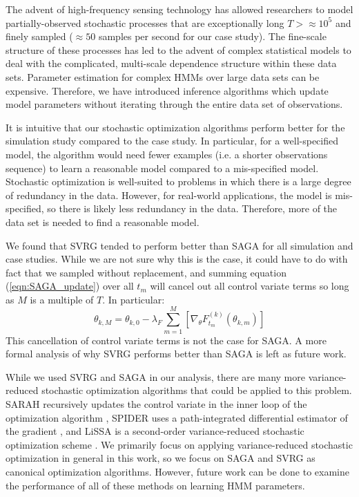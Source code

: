 
The advent of high-frequency sensing technology has allowed researchers to model partially-observed stochastic processes that are exceptionally long $T > \approx 10^5$ and finely sampled ($\approx 50$ samples per second for our case study). The fine-scale structure of these processes has led to the advent of complex statistical models to deal with the complicated, multi-scale dependence structure within these data sets. Parameter estimation for complex HMMs over large data sets can be expensive. Therefore, we have introduced inference algorithms which update model parameters without iterating through the entire data set of observations.

It is intuitive that our stochastic optimization algorithms perform better for the simulation study compared to the case study. In particular, for a well-specified model, the algorithm would need fewer examples (i.e. a shorter observations sequence) to learn a reasonable model compared to a mis-specified model. Stochastic optimization is well-suited to problems in which there is a large degree of redundancy in the data. However, for real-world applications, the model is mis-specified, so there is likely less redundancy in the data. Therefore, more of the data set is needed to find a reasonable model.

We found that SVRG tended to perform better than SAGA for all simulation and case studies. While we are not sure why this is the case, it could have to do with fact that we sampled without replacement, and summing equation (\ref{eqn:SAGA_update}) over all $t_m$ will cancel out all control variate terms so long as $M$ is a multiple of $T$. In particular:
%
\begin{equation}
    \theta_{k,M} = \theta_{k,0} - \lambda_F \sum_{m=1}^{M} \left[\nabla_\theta F^{(k)}_{t_m}(\theta_{k,m})\right]
\end{equation}
%
This cancellation of control variate terms is not the case for SAGA. A more formal analysis of why SVRG performs better than SAGA is left as future work.

While we used SVRG and SAGA in our analysis, there are many more variance-reduced stochastic optimization algorithms that could be applied to this problem. SARAH recursively updates the control variate in the inner loop of the optimization algorithm \citep{Nguyen:2017}, SPIDER uses a path-integrated differential estimator of the gradient \citep{Fang:2018}, and LiSSA is a second-order variance-reduced stochastic optimization scheme \citep{Agarwal:2017}. We primarily focus on applying variance-reduced stochastic optimization in general in this work, so we focus on SAGA and SVRG as canonical optimization algorithms. However, future work can be done to examine the performance of all of these methods on learning HMM parameters.


